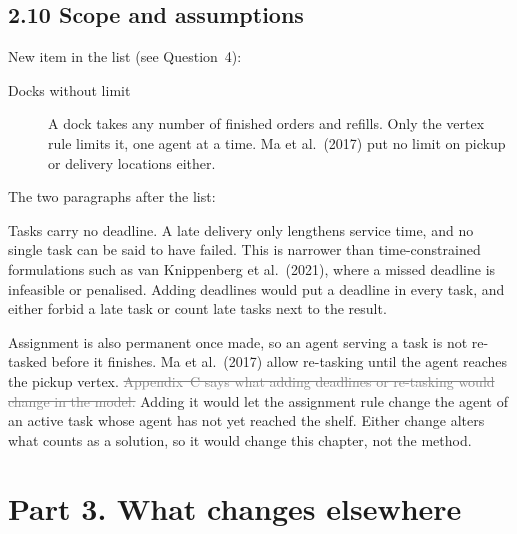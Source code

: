 \documentclass[11pt,a4paper]{article}
\newcommand{\new}[1]{\textcolor{newc}{#1}}
\newcommand{\old}[1]{\textcolor{gray}{\sout{#1}}}
\newenvironment{greenblock}{\color{newc}}{}
\begin{document}
\subsection*{2.10 Scope and assumptions}

New item in the list (see Question~4):

\begin{greenblock}
\begin{description}
  \item[Docks without limit] A dock takes any number of finished orders and
    refills. Only the vertex rule limits it, one agent at a time. Ma et al.\
    (2017) put no limit on pickup or delivery locations either.
\end{description}
\end{greenblock}

The two paragraphs after the list:

Tasks carry no deadline. A late delivery only lengthens service time, and no
single task can be said to have failed. This is narrower than
time-constrained formulations such as van Knippenberg et al.\ (2021), where a
missed deadline is infeasible or penalised. \new{Adding deadlines would put a
deadline in every task, and either forbid a late task or count late tasks
next to the result.}

Assignment is also permanent once made, so an agent serving a task is not
re-tasked before it finishes. Ma et al.\ (2017) allow re-tasking until the
agent reaches the pickup vertex. \old{Appendix~C says what adding deadlines or
re-tasking would change in the model.} \new{Adding it would let the
assignment rule change the agent of an active task whose agent has not yet
reached the shelf. Either change alters what counts as a solution, so it
would change this chapter, not the method.}

\section*{Part 3. What changes elsewhere}
\end{document}
